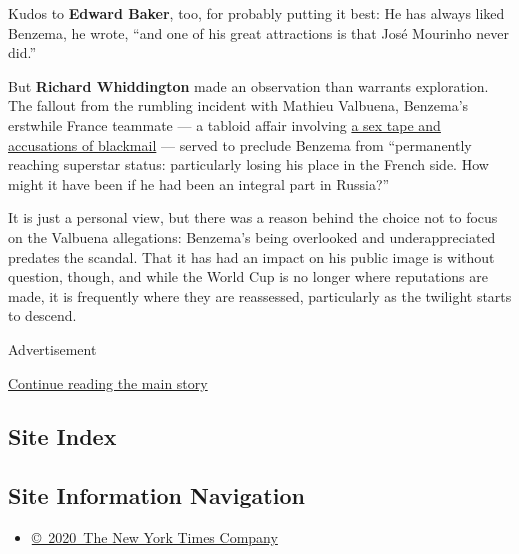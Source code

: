Kudos to \textbf{Edward Baker}, too, for probably putting it best: He
has always liked Benzema, he wrote, ``and one of his great attractions
is that José Mourinho never did.''

But \textbf{Richard Whiddington} made an observation than warrants
exploration. The fallout from the rumbling incident with Mathieu
Valbuena, Benzema's erstwhile France teammate --- a tabloid affair
involving
\href{https://www.theguardian.com/football/2015/nov/04/karim-benzema-arrested-sex-tape-blackmail}{a
sex tape and accusations of blackmail} --- served to preclude Benzema
from ``permanently reaching superstar status: particularly losing his
place in the French side. How might it have been if he had been an
integral part in Russia?''

It is just a personal view, but there was a reason behind the choice not
to focus on the Valbuena allegations: Benzema's being overlooked and
underappreciated predates the scandal. That it has had an impact on his
public image is without question, though, and while the World Cup is no
longer where reputations are made, it is frequently where they are
reassessed, particularly as the twilight starts to descend.

Advertisement

\protect\hyperlink{after-bottom}{Continue reading the main story}

\hypertarget{site-index}{%
\subsection{Site Index}\label{site-index}}

\hypertarget{site-information-navigation}{%
\subsection{Site Information
Navigation}\label{site-information-navigation}}

\begin{itemize}
\tightlist
\item
  \href{https://help.nytimes3xbfgragh.onion/hc/en-us/articles/115014792127-Copyright-notice}{©~2020~The
  New York Times Company}
\end{itemize}

